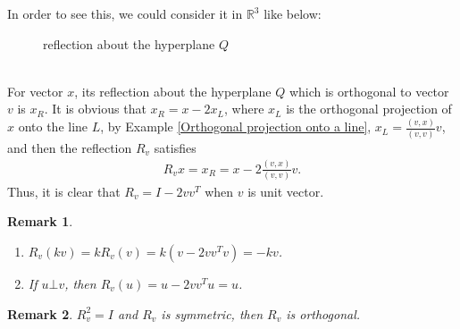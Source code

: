 \documentclass[10pt]{book}
\newtheorem{remark}{Remark}[chapter]
\theoremstyle{definition}
\numberwithin{equation}{chapter}
\begin{document}
\begin{subappendices}
In order to see this, we could consider it in $\mathbb{R}^3$ like below:\\
\begin{figure}[h]
    \centering
    \caption{reflection about the hyperplane $Q$}
    \label{fig:plot_2}
\end{figure}\\
For vector $x$, its reflection about the hyperplane $Q$ which is orthogonal to vector $v$ is $x_R$. It is obvious that $x_R = x - 2 x_L$, where $x_L$ is the orthogonal projection of $x$ onto the line $L$, by Example \ref{Orthogonal projection onto a line}, $x_L = \frac{(v,x)}{(v,v)}v$, and then the reflection $R_v$ satisfies
\begin{align*}
    R_v x = x_R = x - 2 \frac{(v,x)}{(v,v)}v.
\end{align*}
Thus, it is clear that $R_v = I - 2 v v^T$ when $v$ is unit vector. 

\begin{remark}
~\begin{enumerate}[label=(\arabic*)]
    \item $R_v(kv) = k R_v(v) = k (v - 2 v v^T v) = -kv$.
    
    \item If $u \bot v$, then $R_v(u) = u - 2 v v^T u = u$.
\end{enumerate}
\end{remark}

\begin{remark}
$R_v^2 = I$ and $R_v$ is symmetric, then $R_v$ is orthogonal.
\end{remark}


\end{subappendices}
\end{document}
